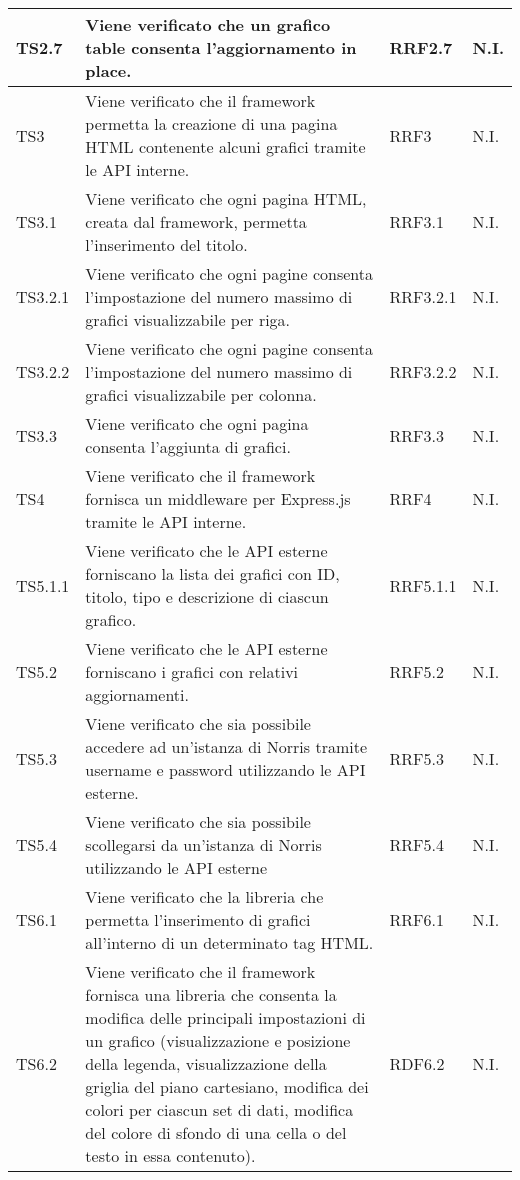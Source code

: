 \begin{longtabu}{| X[0.5] | X | X[0.5] | X[0.4] |}
TS2.7 & Viene verificato che un grafico table consenta l'aggiornamento in place. & RRF2.7 & N.I.\\ \hline

TS3 & Viene verificato che il framework permetta la creazione di una pagina HTML contenente alcuni grafici tramite le API interne. & RRF3 & N.I.\\ \hline

TS3.1 & Viene verificato che ogni pagina HTML, creata dal framework, permetta l'inserimento del titolo. & RRF3.1 & N.I.\\ \hline

TS3.2.1 & Viene verificato che ogni pagine consenta l'impostazione del numero massimo di grafici visualizzabile per riga. & RRF3.2.1 & N.I.\\ \hline

TS3.2.2 & Viene verificato che ogni pagine consenta l'impostazione del numero massimo di grafici visualizzabile per colonna. & RRF3.2.2 & N.I.\\ \hline

TS3.3 & Viene verificato che ogni pagina consenta l'aggiunta di grafici. & RRF3.3 & N.I.\\ \hline

TS4 & Viene verificato che il framework fornisca un middleware per Express.js tramite le API interne. & RRF4 & N.I.\\ \hline

TS5.1.1 & Viene verificato che le API esterne forniscano la lista dei grafici con ID, titolo, tipo e descrizione di ciascun grafico. & RRF5.1.1 & N.I.\\ \hline

TS5.2 & Viene verificato che le API esterne forniscano i grafici con relativi aggiornamenti. & RRF5.2 & N.I.\\ \hline

TS5.3 & Viene verificato che sia possibile accedere ad un'istanza di Norris tramite username e password utilizzando le API esterne. & RRF5.3 & N.I.\\ \hline

TS5.4 & Viene verificato che sia possibile scollegarsi da un'istanza di Norris utilizzando le API esterne & RRF5.4 & N.I.\\ \hline

TS6.1 & Viene verificato che la libreria che permetta l'inserimento di grafici all'interno di un determinato tag HTML. & RRF6.1 & N.I.\\ \hline

TS6.2 & Viene verificato che il framework fornisca una libreria che consenta la modifica delle principali impostazioni di un grafico (visualizzazione e posizione della legenda, visualizzazione della griglia del piano cartesiano, modifica dei colori per ciascun set di dati, modifica del colore di sfondo di una cella o del testo in essa contenuto). & RDF6.2 & N.I.\\ \hline


\end{longtabu}
